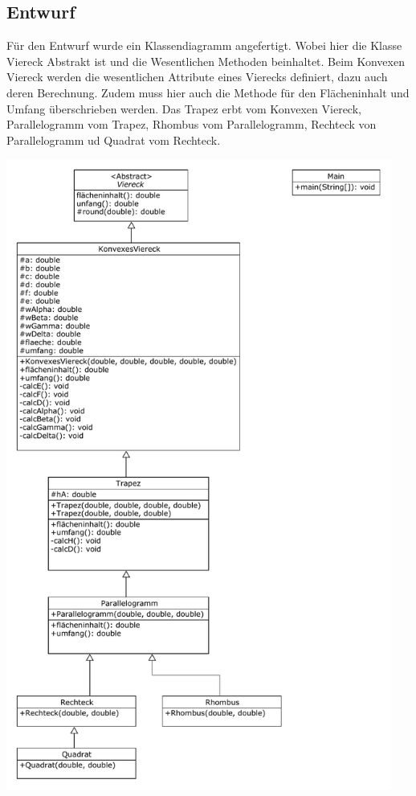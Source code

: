 \subsection{Entwurf}
Für den Entwurf wurde ein Klassendiagramm angefertigt. Wobei hier die Klasse Viereck Abstrakt ist und
die Wesentlichen Methoden beinhaltet. Beim Konvexen Viereck werden die wesentlichen Attribute eines 
Vierecks definiert, dazu auch deren Berechnung. Zudem muss hier auch die Methode für den 
Flächeninhalt und Umfang überschrieben werden. Das Trapez erbt vom Konvexen Viereck, Parallelogramm
vom Trapez, Rhombus vom Parallelogramm, Rechteck von Parallelogramm ud Quadrat vom Rechteck. 
\begin{center}
	\includegraphics[width=0.95\textwidth]{uml/uml_c7_p1.pdf}
\end{center}

